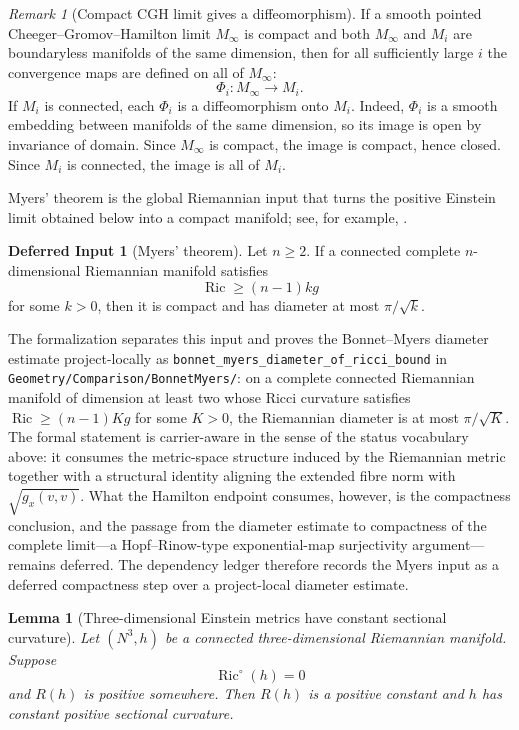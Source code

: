 \documentclass[11pt]{article}
\theoremstyle{plain}
\newtheorem{lemma}[theorem]{Lemma}
\theoremstyle{definition}
\newtheorem{deferred}[theorem]{Deferred Input}
\theoremstyle{remark}
\newtheorem{remark}[theorem]{Remark}
\newcommand{\Ric}{\operatorname{Ric}}
\newcommand{\leanref}[1]{\nolinkurl{#1}}
\newcommand{\leanfile}[1]{\nolinkurl{#1}}
\newcommand{\rfdir}[1]{\leanfile{#1/}}
\begin{document}
\begin{remark}[Compact CGH limit gives a diffeomorphism]
\label{rem:compact-cgh-limit-diffeomorphism}
If a smooth pointed Cheeger--Gromov--Hamilton limit $M_\infty$ is compact and
both $M_\infty$ and $M_i$ are boundaryless manifolds of the same dimension,
then for all sufficiently large $i$ the convergence maps are defined on all of
$M_\infty$:
\[
\Phi_i:M_\infty\to M_i.
\]
If $M_i$ is connected, each $\Phi_i$ is a diffeomorphism onto $M_i$. Indeed,
$\Phi_i$ is a smooth embedding between manifolds of the same dimension, so its
image is open by invariance of domain.  Since $M_\infty$ is compact, the image
is compact, hence closed.  Since $M_i$ is connected, the image is all of $M_i$.
\end{remark}

Myers' theorem is the global Riemannian input that turns the positive Einstein
limit obtained below into a compact manifold; see, for example,
\cite{MR2061425}.

\begin{deferred}[Myers' theorem]
\label{bb:myers}
Let \(n\ge2\).  If a connected complete \(n\)-dimensional Riemannian manifold satisfies
\[
\Ric\ge (n-1)kg
\]
for some $k>0$, then it is compact and has diameter at most $\pi/\sqrt{k}$.
\end{deferred}

The formalization separates this input and proves the Bonnet--Myers diameter
estimate project-locally as
\leanref{bonnet_myers_diameter_of_ricci_bound} in
\rfdir{Geometry/Comparison/BonnetMyers}: on a complete connected Riemannian
manifold of dimension at least two whose Ricci curvature satisfies
\(\Ric\ge(n-1)Kg\) for some \(K>0\), the Riemannian diameter is at most
\(\pi/\sqrt K\).  The formal statement is carrier-aware in the sense of the
status vocabulary above: it consumes the metric-space structure induced by the
Riemannian metric together with a structural identity aligning the extended
fibre norm with \(\sqrt{g_x(v,v)}\).  What the Hamilton endpoint consumes,
however, is the compactness conclusion, and the passage from the diameter
estimate to compactness of the complete limit---a Hopf--Rinow-type
exponential-map surjectivity argument---remains deferred.  The dependency
ledger therefore records the Myers input as a deferred compactness step over a
project-local diameter estimate.

\begin{lemma}[Three-dimensional Einstein metrics have constant sectional curvature]
\label{lem:3d-einstein-space-form}
Let $(N^3,h)$ be a connected three-dimensional Riemannian manifold. Suppose
\[
\Ric^\circ(h)=0
\]
and $R(h)$ is positive somewhere. Then $R(h)$ is a positive constant and $h$
has constant positive sectional curvature.
\end{lemma}
\end{document}
